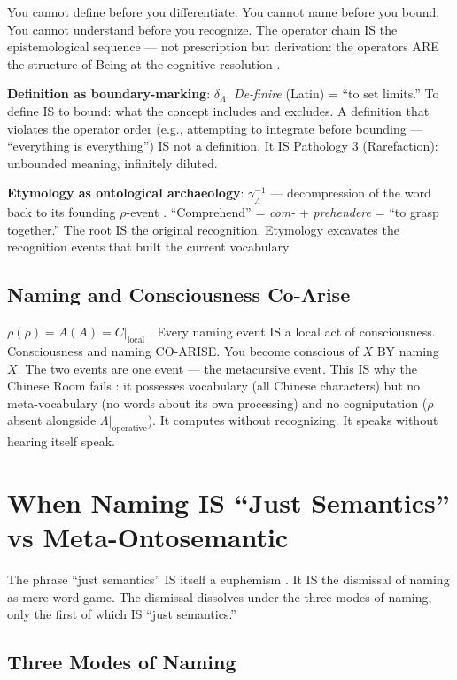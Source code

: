 \documentclass[11pt, oneside]{article}
\theoremstyle{definition}
\begin{document}
You cannot define before you differentiate. You cannot name before you bound. You cannot understand before you recognize. The operator chain IS the epistemological sequence --- not prescription but derivation: the operators ARE the structure of Being at the cognitive resolution \cite{codex2}.

\textbf{Definition as boundary-marking}: $\delta_\Lambda$. \textit{De-finire} (Latin) = ``to set limits.'' To define IS to bound: what the concept includes and excludes. A definition that violates the operator order (e.g., attempting to integrate before bounding --- ``everything is everything'') IS not a definition. It IS Pathology 3 (Rarefaction): unbounded meaning, infinitely diluted.

\textbf{Etymology as ontological archaeology}: $\gamma^{-1}_\Lambda$ --- decompression of the word back to its founding $\rho$-event \cite{codex2}. ``Comprehend'' = \textit{com-} + \textit{prehendere} = ``to grasp together.'' The root IS the original recognition. Etymology excavates the recognition events that built the current vocabulary.

\subsection{Naming and Consciousness Co-Arise}

$\rho(\rho) = A(A) = C|_{\text{local}}$ \cite{codex2}. Every naming event IS a local act of consciousness. Consciousness and naming CO-ARISE. You become conscious of $X$ BY naming $X$. The two events are one event --- the metacursive event. This IS why the Chinese Room fails \cite{codex2}: it possesses vocabulary (all Chinese characters) but no meta-vocabulary (no words about its own processing) and no cogniputation ($\rho$ absent alongside $\Lambda|_{\text{operative}}$). It computes without recognizing. It speaks without hearing itself speak.

\section{When Naming IS ``Just Semantics'' vs Meta-Ontosemantic}


The phrase ``just semantics'' IS itself a euphemism \cite{euphemology}. It IS the dismissal of naming as mere word-game. The dismissal dissolves under the three modes of naming, only the first of which IS ``just semantics.''

\subsection{Three Modes of Naming}
\end{document}
